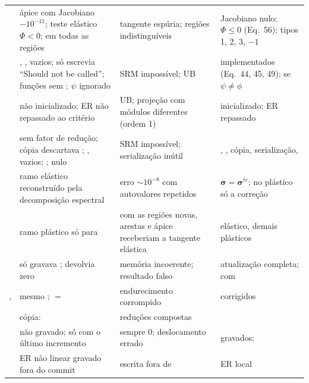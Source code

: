 \documentclass[11pt,a4paper]{article}
\newcommand{\sig}{\bm{\sigma}}
\begin{document}
{\begin{longtable}{@{}L{3.0cm}L{4.5cm}L{3.3cm}L{4.4cm}@{}}
 & ápice com Jacobiano $-10^{-11}$; teste elástico $\Phi<0$;  em todas as regiões & tangente espúria; regiões indistinguíveis & Jacobiano nulo; $\Phi\le0$ (Eq.~56); tipos 1, 2, 3, $-1$\\
 & , ,  vazios;  só escrevia ``Should not be called''; funções sem ; $\psi$ ignorado & SRM impossível; UB & implementados (Eq.~44, 45, 49);  se $\psi\ne\phi$\\
 &  não inicializado; ER não repassado ao critério & UB; projeção com módulos diferentes (ordem 1) & inicializado; ER repassado\\
 & sem fator de redução; cópia descartava ; ,  vazios; ;  nulo & SRM impossível; serialização inútil & , , cópia, serialização, \\
 & ramo elástico reconstruído pela decomposição espectral & erro $\sim10^{-8}$ com autovalores repetidos & $\sig=\sig^{tr}$; no plástico só a correção\\
 & ramo plástico só para  & com as regiões novas, arestas e ápice receberiam a tangente elástica &  elástico, demais plásticos\\
 &  só gravava ;  devolvia zero & memória incoerente; resultado falso & atualização completa;  com \\
,  & mesmo ; $=$ & endurecimento corrompido & corrigidos\\
 & cópia:  & reduções compostas & \\
 &  não gravado;  só com o último incremento &  sempre 0; deslocamento errado & gravados; \\
 & ER não linear gravado fora do commit & escrita fora de  & ER local\\

\end{longtable}}
\end{document}

